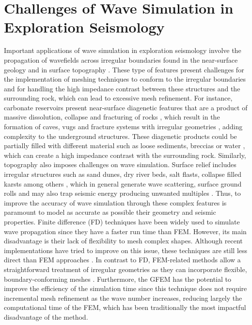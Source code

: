 \section{Challenges of  Wave Simulation in Exploration Seismology}
Important applications of wave simulation  in exploration seismology involve the  propagation  of wavefields across irregular boundaries found in the near-surface geology and  in surface topography \cite{Yilmaz2013, Keho2012, Bridle2007}. These type of features present challenges for the implementation of  meshing techniques to conform to the irregular boundaries and  for handling the high impedance contrast between these structures and the surrounding rock, which can lead to excessive  mesh refinement.  For instance, carbonate reservoirs  present  near-surface diagenetic features  that  are a product of massive dissolution, collapse and fracturing of rocks  \cite{Lucia1999a,Wright1994},  which  result in  the formation of caves, vugs  and fracture systems  with irregular geometries \cite{Huang2017, Robert2006}, adding complexity to the underground structures. These diagenetic products could be partially filled with different material such as loose sediments, breccias  or  water \cite{Regone2017, Lucia1999a }, which can  create a  high impedance contrast with the surrounding rock. Similarly, topography also imposes challenges on wave  simulation. Surface relief includes irregular structures such as sand dunes, dry river beds, salt flasts, collapse filled karsts  among others \cite{Keho2012, Bridle2007},  which in general  generate  wave scattering, surface ground rolls and may also trap seismic energy producing unwanted multiples \cite{Keho2012}. Thus, to  improve the accuracy of wave simulation  through these  complex features is paramount to model as accurate as possible  their  geometry and seismic properties. Finite difference (FD) techniques have been  widely used to simulate wave propagation since they have a faster run time than FEM. However, its main disadvantage is their lack of flexibility to mesh complex shapes. Although recent implementations have tried to improve on this issue, these techniques are  still less direct than FEM approaches \cite{Lan2011,Tessmer1992}. In contrast to FD,  FEM-related methods allow a straightforward treatment of irregular geometries as they can incorporate flexible,  boundary-conforming meshes \cite{Komatitsch1998, Lee2008}. Furthermore, the GFEM has the potential to improve the efficiency of the simulation time since this technique does not require incremental mesh refinement as the wave number increases, reducing largely the computational time of the FEM, which has been traditionally the most impactful disadvantage of the method. 

